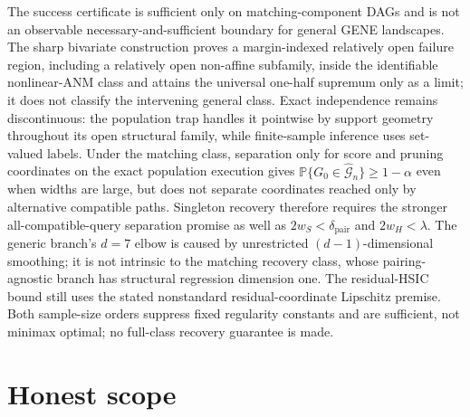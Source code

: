 \documentclass{article}
\begin{document}
The success certificate is sufficient only on matching-component DAGs and is not an observable necessary-and-sufficient boundary for general GENE landscapes. The sharp bivariate construction proves a margin-indexed relatively open failure region, including a relatively open non-affine subfamily, inside the identifiable nonlinear-ANM class and attains the universal one-half supremum only as a limit; it does not classify the intervening general class. Exact independence remains discontinuous: the population trap handles it pointwise by support geometry throughout its open structural family, while finite-sample inference uses set-valued labels. Under the matching class, separation only for score and pruning coordinates on the exact population execution gives \(\mathbb P\{G_0\in\widehat{\mathcal G}_n\}\ge1-\alpha\) even when widths are large, but does not separate coordinates reached only by alternative compatible paths. Singleton recovery therefore requires the stronger all-compatible-query separation promise as well as \(2w_S<\delta_{\mathrm{pair}}\) and \(2w_H<\lambda\). The generic branch's \(d=7\) elbow is caused by unrestricted \((d-1)\)-dimensional smoothing; it is not intrinsic to the matching recovery class, whose pairing-agnostic branch has structural regression dimension one. The residual-HSIC bound still uses the stated nonstandard residual-coordinate Lipschitz premise. Both sample-size orders suppress fixed regularity constants and are sufficient, not minimax optimal; no full-class recovery guarantee is made.

\section{Honest scope}
\end{document}
